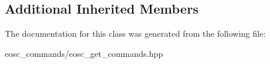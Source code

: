 \subsection*{Additional Inherited Members}


The documentation for this class was generated from the following file\+:\begin{DoxyCompactItemize}
\item 
eosc\+\_\+commands/eosc\+\_\+get\+\_\+commands.\+hpp\end{DoxyCompactItemize}
